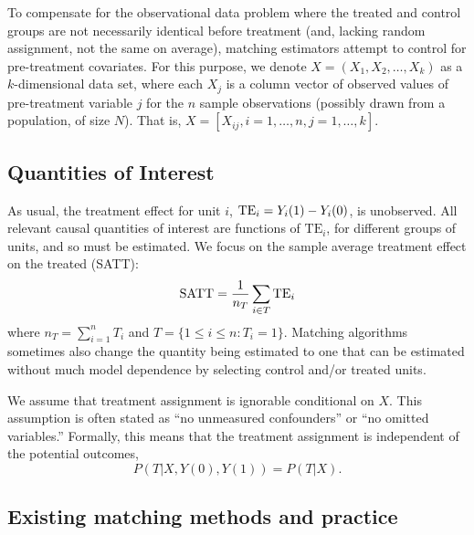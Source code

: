 \documentclass[11pt,titlepage]{article}
\begin{document}
To compensate for the observational data problem where the treated and
control groups are not necessarily identical before treatment (and,
lacking random assignment, not the same on average), matching
estimators attempt to control for pre-treatment covariates.  For this
purpose, we denote $X=(X_1, X_2, \ldots, X_k)$ as a $k$-dimensional
data set, where each $X_j$ is a column vector of  observed
values of pre-treatment variable $j$ for the $n$ sample observations
(possibly drawn from a population, of size $N$).  That is, $X =
[X_{ij}, i=1, \ldots, n, j=1, \ldots, k]$.

\subsection{Quantities of Interest}

As usual, the treatment effect for unit $i$, ${\rm TE}_i = Y_i(1) -
Y_i(0)$, is unobserved.  All relevant causal quantities of interest
are functions of $\textrm{TE}_i$, for different groups of units, and
so must be estimated.  We focus on the sample average treatment effect
on the treated (SATT):
\begin{equation} 
  {\rm SATT} = \frac{1}{n_T} \sum_{i\in T} {\rm TE}_i
\end{equation}
where $n_T = \sum_{i=1}^n T_i$ and $T = \{1 \leq i \leq n : T_i=1\}$.
Matching algorithms sometimes also change the quantity being estimated
to one that can be estimated without much model dependence by
selecting control and/or treated units.

We assume that treatment assignment is ignorable conditional on $X$. This
assumption is often stated as ``no unmeasured confounders'' or ``no
omitted variables.'' Formally, this means that the treatment assignment is
independent of the potential outcomes, 
\begin{equation}
P(T|X,Y(0),Y(1)) = P(T|X).
\end{equation}

\subsection{Existing matching methods and practice}
\end{document}
